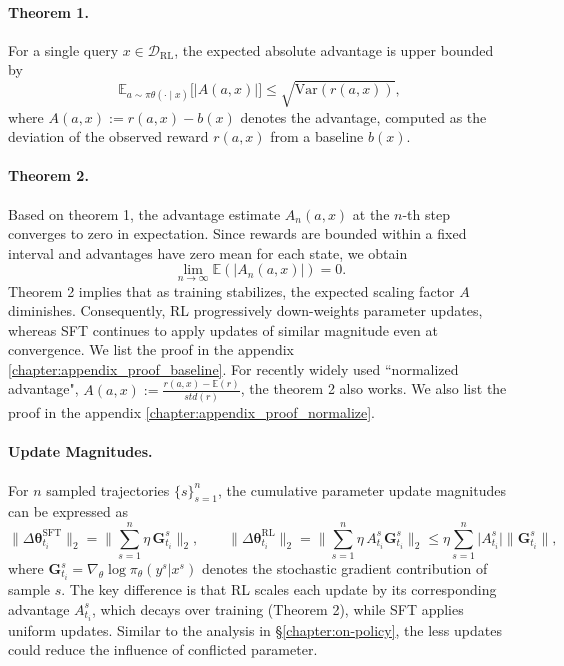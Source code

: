 \documentclass{article} %
\begin{document}
\paragraph{Theorem 1.}
For a single query $x \in \mathcal{D}_{\text{RL}}$, the expected absolute advantage is upper bounded by
\begin{equation}
\mathbb{E}_{a \sim \pi{\theta}(\cdot \mid x)}\big[ |A(a,x)| \big]
\le \sqrt{\mathrm{Var}(r(a,x))},
\end{equation}
where $A(a,x) := r(a,x) - b(x)$ denotes the advantage, computed as the deviation of the observed reward $r(a,x)$ from a baseline $b(x)$.

\paragraph{Theorem 2.}
Based on theorem 1, the advantage estimate $A_n(a,x)$ at the $n$-th step converges to zero in expectation. Since rewards are bounded within a fixed interval and advantages have zero mean for each state, we obtain
\begin{equation}
\lim_{n \to \infty} \mathbb{E}(|A_n(a,x)|) = 0.
\end{equation}
Theorem 2 implies that as training stabilizes, the expected scaling factor $A$ diminishes. Consequently, RL progressively down-weights parameter updates, whereas SFT continues to apply updates of similar magnitude even at convergence. We list the proof in the appendix \ref{chapter:appendix_proof_baseline}.  For recently widely used ``normalized advantage", $A(a,x):= \frac{r(a,x)-\mathbb{E}(r)}{std(r)}$, the theorem 2 also works. We also list the proof in the appendix  \ref{chapter:appendix_proof_normalize}. 


\paragraph{Update Magnitudes.}
For $n$ sampled trajectories $\{s\}_{s=1}^n$, the cumulative parameter update magnitudes can be expressed as
\[
\big\| \Delta \bm{\theta}_{t_i}^{\text{SFT}} \big\|_2 = \Big\| \sum_{s=1}^n \eta \, \bm{G}_{t_i}^s \Big\|_2, 
\qquad
\big\| \Delta \bm{\theta}_{t_i}^{\text{RL}} \big\|_2 = \Big\| \sum_{s=1}^n \eta \, A_{t_i}^s \bm{G}_{t_i}^s \Big\|_2\le \eta \sum_{s=1}^n\Big|A_{t_i}^s\Big|\Big\|\bm{G}_{t_i}^s\Big\|,
\]
where $\bm{G}_{t_i}^s = \nabla_\theta \log \pi_\theta(y^s | x^s)$ denotes the stochastic gradient contribution of sample $s$. The key difference is that RL scales each update by its corresponding advantage $A_{t_i}^s$, which decays over training (Theorem 2), while SFT applies uniform updates. Similar to the analysis in \S \ref{chapter:on-policy}, the less updates could reduce the influence of conflicted parameter. 
\end{document}
